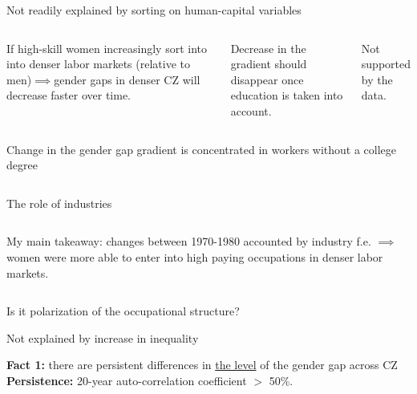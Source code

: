 \begin{frame}{Not readily explained by sorting on human-capital variables}
 	\begin{columns}
 		\bitem
	 		\item If high-skill women increasingly sort into into denser labor markets (relative to men)$\implies$gender gaps in denser CZ will decrease faster over time.
	 		\bitem
	 		\item Decrease in the gradient should disappear once education is taken into account.
	 		\item Not supported by the data.
	 		\eitem 
 		\eitem 
		 { \tiny	}
 	\end{columns}
\end{frame}
\begin{frame}{Change in the gender gap gradient is concentrated in workers without a college degree}
	\begin{columns}
		\column{0.5\textwidth}
		\column{0.5\textwidth}
	\end{columns} 
\end{frame}

\begin{frame}{The role of industries}
	\begin{columns}
	\bitem
		\item My main takeaway: changes between 1970-1980 accounted by industry f.e. $\implies$ women were more able to enter into high paying occupations in denser labor markets.
	\eitem
	{ \tiny	}
\end{columns}
\end{frame}
\begin{frame}{Is it polarization of the occupational structure?}
	\bitem
	\item 
	\eitem 
\end{frame}
\begin{frame}{Not explained by increase in inequality}
	\bitem
	\item 
	\eitem 
\end{frame}


\begin{frame}{\textbf{Fact 1:} there are persistent differences in \underline{the level} of the gender gap across CZ} 
\label{slide:fact1}
{\scriptsize}
\textbf{\alert{Persistence:}} 20-year auto-correlation coefficient $>$ 50\%.

\hspace{1cm} 
\end{frame}

